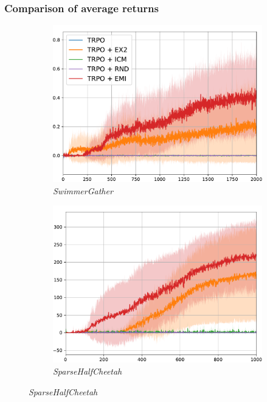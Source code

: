 \documentclass[10pt,mathserif]{beamer}
\begin{document}

\begin{frame}
\frametitle{Comparison of average returns}
  \begin{figure}[ht!]
      \centering
      \begin{subfigure}{0.32\textwidth}
          \includegraphics[width=\textwidth]{emi_figures/SwimmerGather_all.pdf}
          \caption{\textit{SwimmerGather}}
      \end{subfigure}
      \begin{subfigure}{0.32\textwidth}
          \includegraphics[width=\textwidth]{emi_figures/SparseHalfCheetah_all.pdf}
          \caption{\textit{SparseHalfCheetah}}

\end{subfigure}
\end{figure}
\end{frame}
\end{document}
